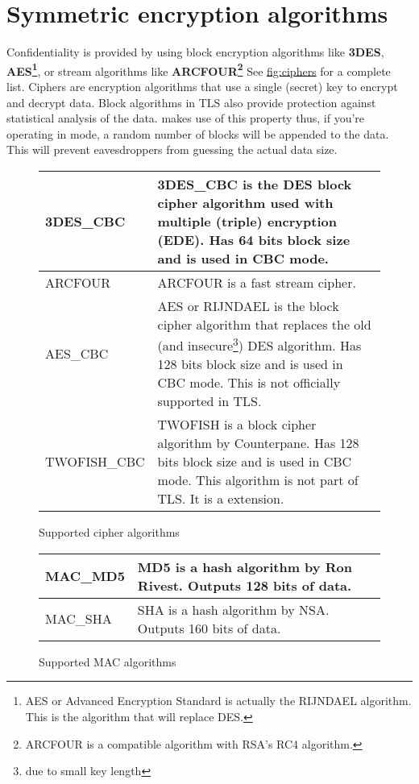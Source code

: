 \section{Symmetric encryption algorithms}
\par
Confidentiality is provided by using block encryption algorithms like {\bf 3DES}, 
{\bf AES\footnote{AES or Advanced Encryption Standard is actually the RIJNDAEL algorithm. This is the
algorithm that will replace DES.}}, or
stream algorithms like {\bf ARCFOUR\footnote{ARCFOUR is a compatible
algorithm with RSA's RC4 algorithm.}} See \hyperref{fig:ciphers}{figure }{}{fig:ciphers} for a complete list. 
Ciphers are encryption algorithms that use a single (secret) key
to encrypt and decrypt data. Block algorithms in TLS also provide protection
against statistical analysis of the data. \gnutls{} makes use of this property
thus, if you're operating in \tlsI{} mode, a random number of blocks will be
appended to the data. This will prevent eavesdroppers from guessing the 
actual data size.

\begin{figure}[hbtp]
\begin{tabular}{|l|p{9cm}|}

\hline
3DES\_CBC & 3DES\_CBC is the DES block cipher algorithm used with multiple (triple)
encryption (EDE). Has 64 bits block size and is used in CBC mode.
\\
\hline
ARCFOUR & ARCFOUR is a fast stream cipher.
\\
\hline
AES\_CBC & AES or RIJNDAEL is the block cipher algorithm that replaces the old 
(and insecure\footnote{due to small key length}) DES algorithm. Has
128 bits block size and is used in CBC mode. This is not officially
supported in TLS.
\\
\hline
TWOFISH\_CBC & TWOFISH is a block cipher algorithm by Counterpane. Has
128 bits block size and is used in CBC mode. This algorithm is not
part of TLS. It is a \gnutls{} extension.
\\
\hline
\end{tabular}
\caption{Supported cipher algorithms}
\label{fig:ciphers}
\end{figure}



\addvspace{1.5cm}

\begin{figure}[hbtp]
\begin{tabular}{|l|p{9cm}|}

\hline
MAC\_MD5 & MD5 is a hash algorithm by Ron Rivest. Outputs 128 bits of data.
\\
\hline
MAC\_SHA & SHA is a hash algorithm by NSA. Outputs 160 bits of data.
\\
\hline
\end{tabular}
\caption{Supported MAC algorithms}
\label{fig:mac}
\end{figure}

